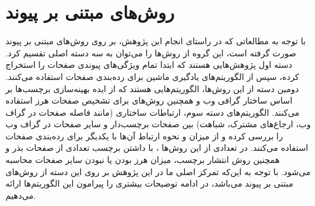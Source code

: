 \documentclass[twoside, a4paper,11pt]{book}
\numberwithin{equation}{chapter}
\numberwithin{table}{chapter}
\numberwithin{figure}{chapter}
\numberwithin{equation}{chapter}
\begin{document}
\section{روش‌های مبتنی بر پیوند}
\label{section:relatedwork-link}
با توجه به مطالعاتی که در راستای انجام این پژوهش، بر روی روش‌های مبتنی بر پیوند صورت گرفته است، این گروه از روش‌ها را می‌توان به سه دسته اصلی تقسیم کرد. دسته اول پژوهش‌هایی \cite{amitay2003connectivity, becchetti2006link, drost2005thwarting} هستند که ابتدا تمام ویژگی‌های پیوندی صفحات را استخراج کرده، سپس از الگوریتم‌های یادگیری ماشین برای رده‌بندی صفحات استفاده می‌کنند. دومین دسته از این روش‌ها، الگوریتم‌هایی \cite{wu2005identifying, wu2006undue, lempel2000stochastic} هستند که از ایده بهینه‌سازی برچسب‌ها بر اساس ساختار گرافی وب و همچنین روش‌های   \cite{abernethy2010graph, cheng2011let, zhou2007transductive} برای تشخیص صفحات هرز استفاده می‌کنند. الگوریتم‌های دسته سوم\cite{castillo2007know, page1999pagerank, caverlee2007countering, joshi2007anchor, gan2007improving, baeza2006generalizing}، ارتباطات ساختاری (مانند فاصله صفحات در گراف وب، ارجاع‌های مشترک، شباهت) بین صفحات برچسب‌دار و سایر صفحات در گراف وب را بررسی کرده و از میزان و نحوه ارتباط آن‌ها با یکدیگر برای رده‌بندی صفحات استفاده می‌کنند. در تعدادی از این روش‌ها \cite{gyongyi2004combating, krishnan2006web, wu2006propagating, becchetti2006using, geng2009link}، با داشتن برچسب تعدادی از صفحات بذر و همچنین روش انتشار برچسب، میزان هرز بودن یا نبودن سایر صفحات  محاسبه می‌شود. با توجه به این‌که تمرکز اصلی ما در این پژوهش بر روی این دسته از روش‌های مبتنی بر پیوند می‌باشد، در ادامه توضیحات بیشتری را پیرامون این الگوریتم‌ها ارائه می‌دهیم.
\end{document}

